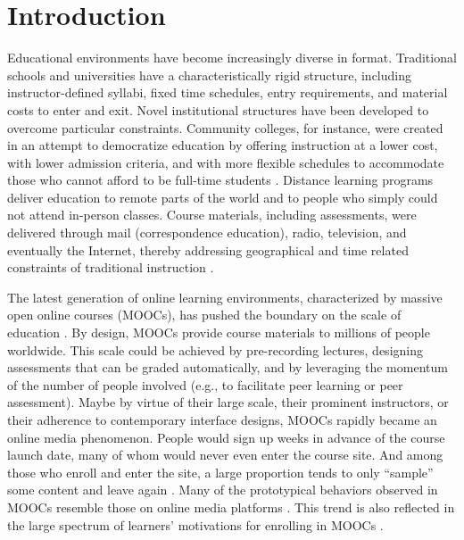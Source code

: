 \documentclass{sigchi}\usepackage[]{graphicx}\usepackage[]{color}
\begin{document}
\section{Introduction}

Educational environments have become increasingly diverse in format. Traditional schools and universities have a characteristically rigid structure, including instructor-defined syllabi, fixed time schedules, entry requirements, and material costs to enter and exit. Novel institutional structures have been developed to overcome particular constraints. Community colleges, for instance, were created in an attempt to democratize education by offering instruction at a lower cost, with lower admission criteria, and with more flexible schedules to accommodate those who cannot afford to be full-time students \cite{goldrick2010challenges}. Distance learning programs deliver education to remote parts of the world and to people who simply could not attend in-person classes. Course materials, including assessments, were delivered through mail (correspondence education), radio, television, and eventually the Internet, thereby addressing geographical and time related constraints of traditional instruction \cite{moore1996distance}.

The latest generation of online learning environments, characterized by massive open online courses (MOOCs), has pushed the boundary on the scale of education \cite{waldrop2013campus}. By design, MOOCs provide course materials to millions of people worldwide. This scale could be achieved by pre-recording lectures, designing assessments that can be graded automatically, and by leveraging the momentum of the number of people involved (e.g., to facilitate peer learning or peer assessment). Maybe by virtue of their large scale, their prominent instructors, or their adherence to contemporary interface designs, MOOCs rapidly became an online media phenomenon. People would sign up weeks in advance of the course launch date, many of whom would never even enter the course site. And among those who enroll and enter the site, a large proportion tends to only ``sample'' some content and leave again \cite{kizilcec2013deconstructing}. Many of the prototypical behaviors observed in MOOCs resemble those on online media platforms \cite{kizilcec2013deconstructing,breslow2013studying}. This trend is also reflected in the large spectrum of learners' motivations for enrolling in MOOCs \cite{kizilcec2015motivation}.
\end{document}
